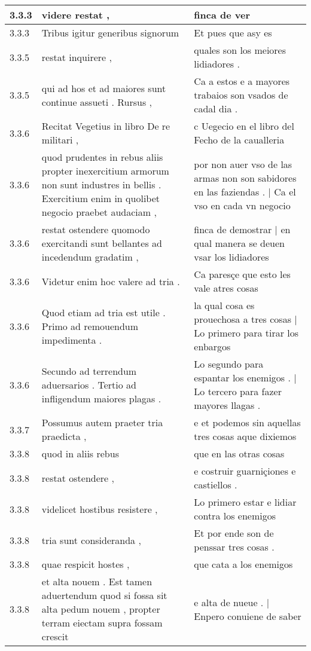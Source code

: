 \begin{tabular}{|p{1cm}|p{6.5cm}|p{6.5cm}|}
3.3.3 & videre restat , & finca de ver \\\hline
3.3.3 & Tribus igitur generibus signorum & Et pues que asy es \\\hline
3.3.5 & restat inquirere , & quales son los meiores lidiadores . \\\hline
3.3.5 & qui ad hos et ad maiores sunt continue assueti . Rursus , & Ca a estos e a mayores trabaios son vsados de cadal dia . \\\hline
3.3.6 & Recitat Vegetius in libro De re militari , & c Uegecio en el libro del Fecho de la caualleria \\\hline
3.3.6 & quod prudentes in rebus aliis propter inexercitium armorum non sunt industres in bellis . Exercitium enim in quolibet negocio praebet audaciam , & por non auer vso de las armas non son sabidores en las faziendas . | Ca el vso en cada vn negocio \\\hline
3.3.6 & restat ostendere quomodo exercitandi sunt bellantes ad incedendum gradatim , & finca de demostrar | en qual manera se deuen vsar los lidiadores \\\hline
3.3.6 & Videtur enim hoc valere ad tria . & Ca paresçe que esto les vale atres cosas \\\hline
3.3.6 & Quod etiam ad tria est utile . Primo ad remouendum impedimenta . & la qual cosa es prouechosa a tres cosas | Lo primero para tirar los enbargos \\\hline
3.3.6 & Secundo ad terrendum aduersarios . Tertio ad infligendum maiores plagas . & Lo segundo para espantar los enemigos . | Lo tercero para fazer mayores llagas . \\\hline
3.3.7 & Possumus autem praeter tria praedicta , & e et podemos sin aquellas tres cosas aque dixiemos \\\hline
3.3.8 & quod in aliis rebus & que en las otras cosas \\\hline
3.3.8 & restat ostendere , & e costruir guarniçiones e castiellos . \\\hline
3.3.8 & videlicet hostibus resistere , & Lo primero estar e lidiar contra los enemigos \\\hline
3.3.8 & tria sunt consideranda , & Et por ende son de penssar tres cosas . \\\hline
3.3.8 & quae respicit hostes , & que cata a los enemigos \\\hline
3.3.8 & et alta nouem . Est tamen aduertendum quod si fossa sit alta pedum nouem , propter terram eiectam supra fossam crescit & e alta de nueue . | Enpero conuiene de saber \\\hline

\end{tabular}
